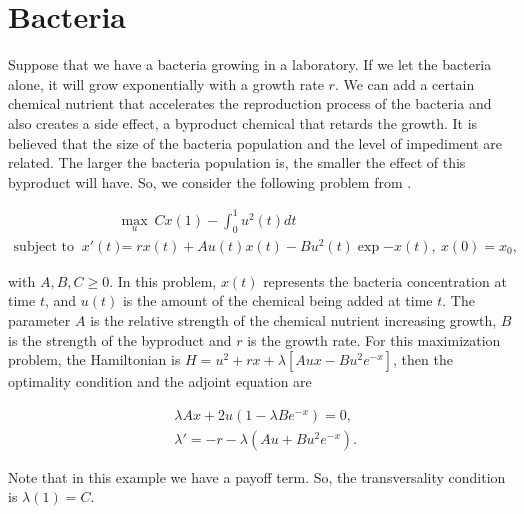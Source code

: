 \section{Bacteria}	%
	
    Suppose that we have a bacteria growing in a laboratory. If we let the bacteria alone, it will grow exponentially with a growth rate $r$. We can add a certain chemical nutrient that accelerates the reproduction process of the bacteria and also creates a side effect, a byproduct chemical that retards the growth.  It is believed that the size of the bacteria population and the level of impediment are related. The larger the bacteria population is, the smaller the effect of this byproduct will have. So, we consider the following problem from \citep{lenhart2007optimal}.
    
    \begin{align*}
    	&\max_{u} \ Cx(1) - \int_{0}^{1} u^2(t) dt \\
        \text{subject to } \ x'(t) &= rx(t) + Au(t)x(t) - Bu^2(t)\exp{-x(t)},%
        \ x(0) = x_0,
    \end{align*}
    
    \noindent with $A, B, C \geq 0$. In this problem, $x(t)$ represents the bacteria
    concentration at time $t$, and $u(t)$ is the amount of the chemical being
    added at time $t$. The parameter $A$ is the relative strength of the 
    chemical nutrient increasing growth, $B$ is the strength of the byproduct 
    and $r$ is the growth rate. For this maximization problem, the Hamiltonian
    is $H = u^2 + rx + \lambda[Aux - Bu^2 e^{-x}]$, then the optimality condition
    and the adjoint equation are
    
    \begin{align*}
        &\lambda Ax + 2u(1 - \lambda Be^{-x}) = 0, \\
        & \lambda' = -r - \lambda(Au + Bu^2 e^{-x}).
    \end{align*}
    
    \noindent Note that in this example we have a payoff term. So, the 
    transversality condition is   $\lambda (1) = C$.
    
